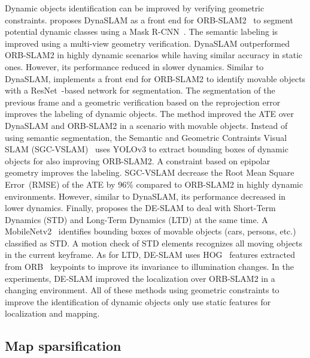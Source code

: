 Dynamic objects identification can be improved by verifying geometric constraints.
\cite{bescos-et-al:2018:2860039} proposes DynaSLAM as a front end for ORB-SLAM2~\parencite{discussion:orb-slam2} to segment potential dynamic classes using a Mask R-CNN~\parencite{original:mask-rcnn}. The semantic labeling is improved using a multi-view geometry verification. DynaSLAM outperformed ORB-SLAM2 in highly dynamic scenarios while having similar accuracy in static ones. However, its performance reduced in slower dynamics.
Similar to DynaSLAM, \cite{wang-et-al:2019:8793499} implements a front end for ORB-SLAM2 to identify movable objects with a ResNet~\parencite{original:resnet}-based network for segmentation. The segmentation of the previous frame and a geometric verification based on the reprojection error improves the labeling of dynamic objects. The method improved the ATE over DynaSLAM and ORB-SLAM2 in a scenario with movable objects.
Instead of using semantic segmentation, the Semantic and Geometric Contraints Visual SLAM (SGC-VSLAM)~\parencite{yang-et-al:2020:s20082432} uses YOLOv3 to extract bounding boxes of dynamic objects for also improving ORB-SLAM2. A constraint based on epipolar geometry improves the labeling. SGC-VSLAM decrease the Root Mean Square Error~(RMSE) of the ATE by 96\% compared to ORB-SLAM2 in highly dynamic environments. However, similar to DynaSLAM, its performance decreased in lower dynamics.
Finally, \cite{xing-et-al:2022:22062} proposes the DE-SLAM to deal with Short-Term Dynamics (STD) and Long-Term Dynamics (LTD) at the same time. A MobileNetv2~\parencite{original:mobilenetv2} identifies bounding boxes of movable objects (cars, persons, etc.) classified as STD. A motion check of STD elements recognizes all moving objects in the current keyframe. As for LTD, DE-SLAM uses HOG~\parencite{original:hog} features extracted from ORB~\parencite{original:orb} keypoints to improve its invariance to illumination changes. In the experiments, DE-SLAM improved the localization over ORB-SLAM2 in a changing environment.
All of these methods using geometric constraints to improve the identification of dynamic objects only use static features for localization and mapping.





\subsection{Map sparsification}
\label{sec:discussion:sparsity}


